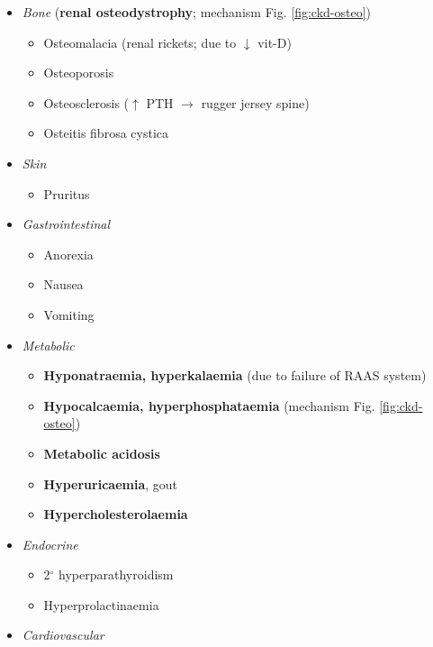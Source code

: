 \documentclass[
  12pt,
]{memoir}
\providecommand{\tightlist}{%
  \setlength{\itemsep}{0pt}\setlength{\parskip}{0pt}}
\begin{document}
\begin{itemize}
\tightlist
\item
  \emph{Bone} (\textbf{renal osteodystrophy}; mechanism Fig.
  \ref{fig:ckd-osteo})

  \begin{itemize}
  \tightlist
  \item
    Osteomalacia (renal rickets; due to \(\downarrow\) vit-D)
  \item
    Osteoporosis
  \item
    Osteosclerosis (\(\uparrow\) PTH \(\rightarrow\) rugger jersey
    spine)
  \item
    Osteitis fibrosa cystica
  \end{itemize}
\item
  \emph{Skin}

  \begin{itemize}
  \tightlist
  \item
    Pruritus
  \end{itemize}
\item
  \emph{Gastrointestinal}

  \begin{itemize}
  \tightlist
  \item
    Anorexia
  \item
    Nausea
  \item
    Vomiting
  \end{itemize}
\item
  \emph{Metabolic}

  \begin{itemize}
  \tightlist
  \item
    \textbf{Hyponatraemia, hyperkalaemia} (due to failure of RAAS
    system)
  \item
    \textbf{Hypocalcaemia, hyperphosphataemia} (mechanism Fig.
    \ref{fig:ckd-osteo})
  \item
    \textbf{Metabolic acidosis}
  \item
    \textbf{Hyperuricaemia}, gout
  \item
    \textbf{Hypercholesterolaemia}
  \end{itemize}
\item
  \emph{Endocrine}

  \begin{itemize}
  \tightlist
  \item
    2\(^{\circ}\) hyperparathyroidism
  \item
    Hyperprolactinaemia
  \end{itemize}
\item
  \emph{Cardiovascular}


\end{itemize}
\end{document}
